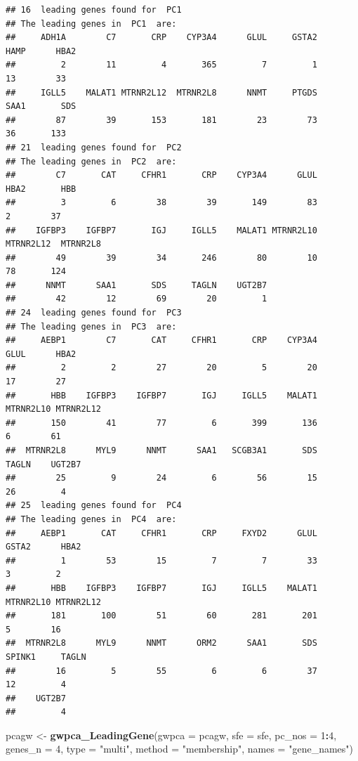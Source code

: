 \documentclass[
]{book}
\newenvironment{Shaded}{\begin{snugshade}}{\end{snugshade}}
\newcommand{\AttributeTok}[1]{\textcolor[rgb]{0.13,0.29,0.53}{#1}}
\newcommand{\DecValTok}[1]{\textcolor[rgb]{0.00,0.00,0.81}{#1}}
\newcommand{\FunctionTok}[1]{\textcolor[rgb]{0.13,0.29,0.53}{\textbf{#1}}}
\newcommand{\NormalTok}[1]{#1}
\newcommand{\OtherTok}[1]{\textcolor[rgb]{0.56,0.35,0.01}{#1}}
\newcommand{\SpecialCharTok}[1]{\textcolor[rgb]{0.81,0.36,0.00}{\textbf{#1}}}
\newcommand{\StringTok}[1]{\textcolor[rgb]{0.31,0.60,0.02}{#1}}
\begin{document}
\begin{verbatim}
## 16  leading genes found for  PC1
## The leading genes in  PC1  are:
##     ADH1A        C7       CRP    CYP3A4      GLUL     GSTA2      HAMP      HBA2 
##         2        11         4       365         7         1        13        33 
##     IGLL5    MALAT1 MTRNR2L12  MTRNR2L8      NNMT     PTGDS      SAA1       SDS 
##        87        39       153       181        23        73        36       133 
## 21  leading genes found for  PC2
## The leading genes in  PC2  are:
##        C7       CAT     CFHR1       CRP    CYP3A4      GLUL      HBA2       HBB 
##         3         6        38        39       149        83         2        37 
##    IGFBP3    IGFBP7       IGJ     IGLL5    MALAT1 MTRNR2L10 MTRNR2L12  MTRNR2L8 
##        49        39        34       246        80        10        78       124 
##      NNMT      SAA1       SDS     TAGLN    UGT2B7 
##        42        12        69        20         1 
## 24  leading genes found for  PC3
## The leading genes in  PC3  are:
##     AEBP1        C7       CAT     CFHR1       CRP    CYP3A4      GLUL      HBA2 
##         2         2        27        20         5        20        17        27 
##       HBB    IGFBP3    IGFBP7       IGJ     IGLL5    MALAT1 MTRNR2L10 MTRNR2L12 
##       150        41        77         6       399       136         6        61 
##  MTRNR2L8      MYL9      NNMT      SAA1   SCGB3A1       SDS     TAGLN    UGT2B7 
##        25         9        24         6        56        15        26         4 
## 25  leading genes found for  PC4
## The leading genes in  PC4  are:
##     AEBP1       CAT     CFHR1       CRP     FXYD2      GLUL     GSTA2      HBA2 
##         1        53        15         7         7        33         3         2 
##       HBB    IGFBP3    IGFBP7       IGJ     IGLL5    MALAT1 MTRNR2L10 MTRNR2L12 
##       181       100        51        60       281       201         5        16 
##  MTRNR2L8      MYL9      NNMT      ORM2      SAA1       SDS    SPINK1     TAGLN 
##        16         5        55         6         6        37        12         4 
##    UGT2B7 
##         4
\end{verbatim}

\begin{Shaded}
\begin{Highlighting}[]
\NormalTok{pcagw }\OtherTok{\textless{}{-}} \FunctionTok{gwpca\_LeadingGene}\NormalTok{(}\AttributeTok{gwpca =}\NormalTok{ pcagw, }
                           \AttributeTok{sfe =}\NormalTok{ sfe, }
                           \AttributeTok{pc\_nos =} \DecValTok{1}\SpecialCharTok{:}\DecValTok{4}\NormalTok{, }
                           \AttributeTok{genes\_n =} \DecValTok{4}\NormalTok{, }
                           \AttributeTok{type =} \StringTok{"multi"}\NormalTok{, }
                           \AttributeTok{method =} \StringTok{"membership"}\NormalTok{, }
                           \AttributeTok{names =} \StringTok{"gene\_names"}\NormalTok{)}
\end{Highlighting}
\end{Shaded}
\end{document}
